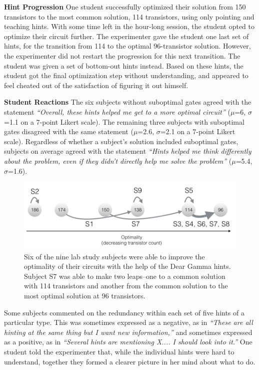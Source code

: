 {\bf Hint Progression} One student successfully optimized their solution from 150 transistors to the most common solution, 114 transistors, using only pointing and teaching hints. With some time left in the hour-long session, the student opted to optimize their circuit further. The experimenter gave the student one last set of hints, for the transition from 114 to the optimal 96-transistor solution. However, the experimenter did not restart the progression for this next transition. The student was given a set of bottom-out hints instead. Based on these hints, the student got the final optimization step without understanding, and appeared to feel cheated out of the satisfaction of figuring it out himself. 

{\bf Student Reactions} The six subjects without suboptimal gates agreed with the statement {\it ``Overall, these hints helped me get to a more optimal circuit''} ($\mu$=6, $\sigma$=1.1 on a 7-point Likert scale). The remaining three subjects with suboptimal gates disagreed with the same statement ($\mu$=2.6, $\sigma$=2.1 on a 7-point Likert scale). Regardless of whether a subject's solution included suboptimal gates, subjects on average agreed with the statement {\it ``Hints helped me think differently about the problem, even if they didn't directly help me solve the problem'' } ($\mu$=5.4, $\sigma$=1.6).



\begin{figure}
\centering
\includegraphics[width=1.0\columnwidth]{Body/figures/classoverflow/dearGammaResults.png}
\caption{Six of the nine lab study subjects were able to improve the optimality of their circuits with the help of the Dear Gamma hints. Subject S7 was able to make two leaps--one to a common solution with 114 transistors and another from the common solution to the most optimal solution at 96 transistors.}
\label{fig:gammaresults}
\end{figure}

Some subjects commented on the redundancy within each set of five hints of a particular type. This was sometimes expressed as a negative, as in {\it ``These are all hinting at the same thing but I want new information,''} and sometimes expressed as a positive, as in {\it ``Several hints are mentioning X.... I should look into it.''} One student told the experimenter that, while the individual hints were hard to understand, together they formed a clearer picture in her mind about what to do.


